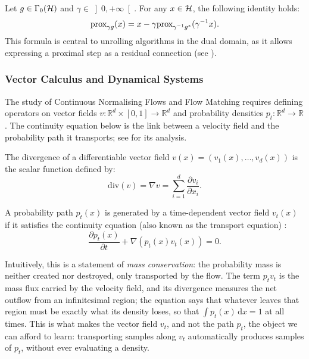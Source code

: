 \documentclass[a4paper,11pt]{article}
\newcommand{\RR}{\ensuremath{\mathbb{R}}}
\newcommand{\RPP}{\ensuremath{\left]0,+\infty\right[}}
\newcommand{\prox}{\ensuremath{\text{\rm prox}}}
\theoremstyle{plain}{\theorembodyfont{\rmfamily}%
\newtheorem{proposition}[theorem]{Proposition}}
\theoremstyle{plain}{\theorembodyfont{\rmfamily}%
\newtheorem{notation}[theorem]{Notation}}
\theoremstyle{plain}{\theorembodyfont{\rmfamily}%
\newtheorem{assumption}[theorem]{Assumption}}
\theoremstyle{plain}{\theorembodyfont{\rmfamily}%
\newtheorem{problem}[theorem]{Problem}}
\theoremstyle{plain}{\theorembodyfont{\rmfamily}%
\newtheorem{example}[theorem]{Example}}
\theoremstyle{plain}{\theorembodyfont{\rmfamily}%
\newtheorem{remark}[theorem]{Remark}}
\theoremstyle{plain}{\theorembodyfont{\rmfamily}%
\newtheorem{definition}[theorem]{Definition}}
\theoremstyle{plain}{\theorembodyfont{\rmfamily}%
\newtheorem{question}[theorem]{Question}}
\numberwithin{equation}{section}
\begin{document}
\begin{proposition}
Let $g \in \Gamma_0({\mathcal{H}})$ and $\gamma \in \RPP$. For any $x \in {\ensuremath{\mathcal{H}}}$, the following identity holds:
\begin{equation}
    \prox_{\gamma g}(x) = x - \gamma \prox_{\gamma^{-1} g^*}(\gamma^{-1} x).
\end{equation}
This formula is central to unrolling algorithms in the dual domain, as it allows expressing a proximal step as a residual connection (see ).
\end{proposition}

\subsubsection{Vector Calculus and Dynamical Systems}

The study of Continuous Normalising Flows and Flow Matching requires defining operators on vector fields $v: \RR^d \times [0, 1] \to \RR^d$ and probability densities $p_t: \RR^d \to \RR$. The continuity equation below is the link between a velocity field and the probability path it transports; see \cite{villani2009optimal, ambrosio2008gradient} for its analysis.

\begin{definition}[Divergence]
The divergence of a differentiable vector field $v(x) = (v_1(x), \dots, v_d(x))$ is the scalar function defined by:
\begin{equation}
    \text{div}(v) = \nabla v = \sum_{i=1}^d \frac{\partial v_i}{\partial x_i}.
\end{equation}
\end{definition}

\begin{definition}
A probability path $p_t(x)$ is generated by a time-dependent vector field $v_t(x)$ if it satisfies the continuity equation (also known as the transport equation) \cite[Chapter 8]{ambrosio2005gradient}:
\begin{equation}
    \frac{\partial p_t(x)}{\partial t} + \nabla (p_t(x) v_t(x)) = 0.
\end{equation}

Intuitively, this is a statement of \emph{mass conservation}: the probability
mass is neither created nor destroyed, only transported by the flow. The term
$p_t v_t$ is the mass flux carried by the velocity field, and its divergence
measures the net outflow from an infinitesimal region; the equation says that
whatever leaves that region must be exactly what its density loses, so that
$\int p_t(x)\,\mathrm{d}x = 1$ at all times. This is what makes the vector field
$v_t$, and not the path $p_t$, the object we can afford to learn: transporting
samples along $v_t$ automatically produces samples of $p_t$, without ever
evaluating a density.

\end{definition}
\end{document}
